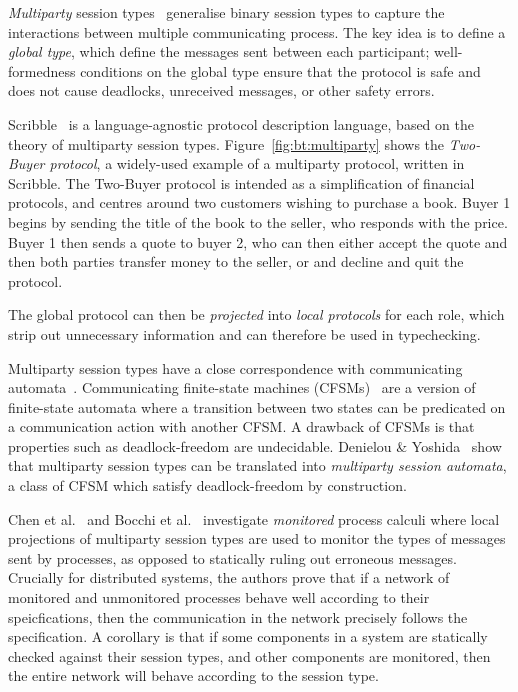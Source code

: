 \documentclass[
graybox,
envcountchap
]{svmult}
\begin{document}
\begin{bibunit}
\emph{Multiparty} session types~\cite{HondaYC16:mpst} generalise binary session types to
capture the interactions between multiple communicating process. The key idea is
to define a \emph{global type}, which define the messages sent between each
participant; well-formedness conditions on the global type ensure that the
protocol is safe and does not cause deadlocks, unreceived messages, or other
safety errors.

Scribble~\cite{YoshidaHNN13:scribble} is a language-agnostic protocol description language, based
on the theory of multiparty session types. Figure~\ref{fig:bt:multiparty} shows
the \emph{Two-Buyer protocol}, a widely-used example of a multiparty protocol,
written in Scribble. The Two-Buyer protocol is intended as a simplification of
financial protocols, and centres around two customers wishing to purchase a
book. Buyer 1 begins by sending the title of the book to the seller, who
responds with the price. Buyer 1 then sends a quote to buyer 2, who can then
either accept the quote and then both parties transfer money to the seller, or
and decline and quit the protocol.

The global protocol can then be \emph{projected} into \emph{local protocols} for
each role, which strip out unnecessary information and can therefore be used in
typechecking.

  Multiparty session types have a close correspondence with communicating
  automata~\cite{DenielouY12:mpst-automata}. Communicating finite-state
  machines (CFSMs)~\cite{BrandZ83:cfsms} are a version of finite-state automata
  where a transition between two states can be predicated on a communication
  action with another CFSM. A drawback of CFSMs is that properties such as
  deadlock-freedom are undecidable. Denielou \&
  Yoshida~\cite{DenielouY12:mpst-automata} show that multiparty session types
  can be translated into \emph{multiparty session automata}, a class of CFSM
  which satisfy deadlock-freedom by construction.

  Chen et al.~\cite{ChenBDHY11:monitoring} and Bocchi et
  al.~\cite{BocchiCDHY13:monitoring} investigate \emph{monitored} process
  calculi where local projections of multiparty session types are used to
  monitor the types of messages sent by processes, as opposed to statically
  ruling out erroneous messages. Crucially for distributed systems,
  the authors prove that if a network of monitored and unmonitored processes
  behave well according to their speicfications, then the communication in the
  network precisely follows the specification. A corollary is that if some
  components in a system are statically checked against their session types, and
  other components are monitored, then the entire network will behave according
  to the session type.


\end{bibunit}
\end{document}
